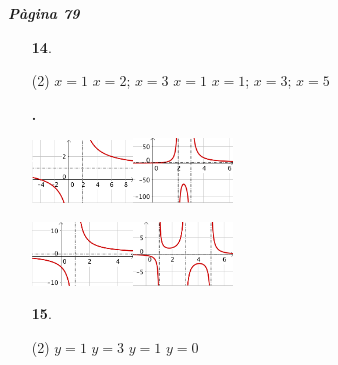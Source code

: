 \documentclass[a4paper, pdf, twoside]{book}
\begin{document}
\begin{multicols}{2}

{\textbf{\em Pàgina 79}} \hrulefill
\begin{enumerate}
\vspace{0.25cm}



 \item[\fontfamily{phv}\selectfont\color{blue}\textbf{14}. ] 
 \begin{tasks}[column-sep=1em, item-indent=1.3333em](2)
	 \task $x=1$
	 \task $x=2$; $x=3$
	 \task $x=1$
	 \task $x=1$; $x=3$; $x=5$
\end{tasks}
 \end{enumerate}
\begin{enumerate}
\vspace{0.25cm}
\item[\fontfamily{phv}\selectfont\color{blue}\textbf{. }] 
\mbox {}\par \includegraphics [width=0.21\textwidth ]{img-sol/t6-14a}\includegraphics [width=0.21\textwidth ]{img-sol/t6-14b}\par \includegraphics [width=0.21\textwidth ]{img-sol/t6-14c}\includegraphics [width=0.21\textwidth ]{img-sol/t6-14d}\par 
\vspace{0.25cm}



 \item[\fontfamily{phv}\selectfont\color{blue}\textbf{15}. ] 
 \begin{tasks}[column-sep=1em, item-indent=1.3333em](2)
	 \task $y=1$
	 \task $y=3$
	 \task $y=1$
	 \task $y=0$
\end{tasks}
 \end{enumerate}
\vspace{0.3cm}


\end{multicols}
\end{document}
